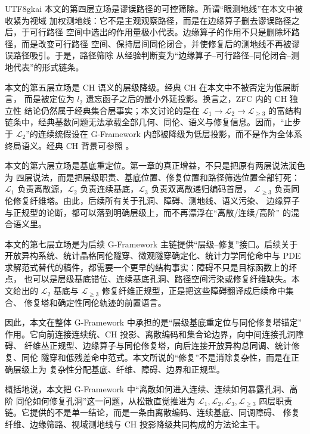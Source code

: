 \documentclass[12pt]{article}
\newcommand{\GFramework}{\textsf{G-Framework}}
\newcommand{\Lone}{\mathcal{L}_1}
\newcommand{\Ltwo}{\mathcal{L}_2}
\newcommand{\Lthree}{\mathcal{L}_3}
\newcommand{\Lge}{\mathcal{L}_{\ge 3}}
\begin{document}
\begin{CJK*}{UTF8}{gkai}
本文的第四层立场是谬误路径的可控筛除。所谓“眼测地线”在本文中被收紧为视域
加权测地线：它不是主观观察路径，而是在边缘算子删去谬误路径之后，于可行路径
空间中选出的作用量极小代表。边缘算子的作用不只是删除坏路径，而是改变可行路径
空间、保持层间同伦闭合，并使修复后的测地线不再被谬误路径吸引。于是，路径筛除
从经验判断变为“边缘算子--可行路径--同伦闭合--测地代表”的形式链条。

本文的第五层立场是 CH 语义的层级降级。经典 CH 在本文中不被否定为低层断言，
而是被定位为 \(l_2\) 遗忘函子之后的最小外延投影。换言之，ZFC 内的 CH 独立性
结论仍然属于经典集合层事实；本文讨论的是在 \(\Lone\to\Ltwo\to\Lge\) 的富结构
链条中，经典基数问题无法承载全部几何、同伦、语义与修复信息。因而，“止步于
\(\Ltwo\)”的连续统假设在 \GFramework{} 内部被降级为低层投影，而不是作为全体系
终局语义。经典 CH 背景可参照 \cite{Godel1940CH,Cohen1963CHI,Cohen1964CHII,Jech2003SetTheory}。

本文的第六层立场是基底重定位。第一章的真正增益，不只是把原有两层说法润色为
四层说法，而是把层级职责、基底位置、修复位置和路径筛选位置全部钉死：\(\Lone\)
负责离散源，\(\Ltwo\) 负责连续基底，\(\Lthree\) 负责双离散递归编码首层，
\(\Lge\) 负责同伦修复纤维塔。由此，后续所有关于孔洞、障碍、测地线、语义污染、
边缘算子与正规型的论断，都可以落到明确层级上，而不再漂浮在“离散/连续/高阶”
的混合语义里。

本文的第七层立场是为后续 \GFramework{} 主链提供“层级--修复”接口。后续关于
开放异构系统、统计晶格同伦隧穿、微观隧穿确定化、统计力学同伦命中与 PDE
求解范式替代的稿件，都需要一个更早的结构事实：障碍不只是目标函数上的坏点，
也可以是层级基底错位、连续基底孔洞、路径空间污染或修复纤维缺失。本文给出的
\(\Ltwo\) 基底与 \(\Lge\) 修复纤维正规型，正是把这些障碍翻译成后续命中集合、
修复塔和确定性同伦轨迹的前置语言。

因此，本文在整体 \GFramework{} 中承担的是“层级基底重定位与同伦修复塔锚定”
作用。它向前连接连续统、CH 投影、离散编码和集合论边界，向中间连接孔洞障碍、
纤维丛正规型、边缘算子与同伦修复塔，向后连接开放异构总同调、统计修复、同伦
隧穿和低残差命中范式。本文所说的“修复”不是消除复杂性，而是在正确层级上为
复杂性分配基底、纤维、障碍、边界和正规型。

概括地说，本文把 \GFramework{} 中“离散如何进入连续、连续如何暴露孔洞、高阶
同伦如何修复孔洞”这一问题，从松散直觉推进为 \(\Lone,\Ltwo,\Lthree,\Lge\)
四层职责链。它提供的不是单一结论，而是一条由离散编码、连续基底、同调障碍、
修复纤维、边缘筛路、视域测地线与 CH 投影降级共同构成的方法论主干。

\setcounter{tocdepth}{3}
\setcounter{secnumdepth}{3}
\tableofcontents
\clearpage


\end{CJK*}
\end{document}
